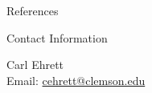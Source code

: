 \documentclass[final]{beamer}
\newlength{\onecolwid}
\begin{document}
\begin{frame}[t]
\begin{columns}[t]
\begin{column}{\onecolwid}

%
%
%

\begin{alertblock}{References}
{
\tiny




}

\end{alertblock}



\begin{alertblock}{Contact Information}

\centering Carl Ehrett\\
\centering Email: \href{mailto:cehrett@clemson.edu}{cehrett@clemson.edu}

\end{alertblock}



\end{column} %

\end{columns} %

\end{frame} %
\end{document}
